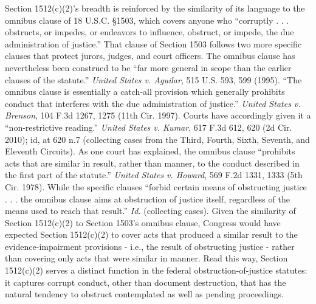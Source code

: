Section 1512(c)(2)’s breadth is reinforced by the similarity of its language to the omnibus clause of 18 U.S.C. \S 1503, which covers anyone who “corruptly . . . obstructs, or impedes, or endeavors to influence, obstruct, or impede, the due administration of justice.” That clause of Section 1503 follows two more specific clauses that protect jurors, judges, and court officers.
The omnibus clause has nevertheless been construed to be “far more general in scope than the earlier clauses of the statute.”
\textit{United States v. Aguilar}, 515 U.S. 593, 599 (1995).
“The omnibus clause is essentially a catch-all provision which generally prohibits conduct that interferes with the due administration of justice.”
\textit{United States v. Brenson}, 104 F.3d 1267, 1275 (11th Cir. 1997).
Courts have accordingly given it a “non-restrictive reading.”
\textit{United States v. Kumar}, 617 F.3d 612, 620 (2d Cir. 2010); id, at 620 n.7 (collecting cases from the Third, Fourth, Sixth, Seventh, and Eleventh Circuits).
As one court has explained, the omnibus clause “prohibits acts that are similar in result, rather than manner, to the conduct described in the first part of the statute.”
\textit{United States v. Howard}, 569 F.2d 1331, 1333 (5th Cir. 1978).
While the specific clauses “forbid certain means of obstructing justice . . . the omnibus clause aims at obstruction of justice itself, regardless of the means used to reach that result.”
\textit{Id.} (collecting cases).
Given the similarity of Section 1512(c)(2) to Section 1503’s omnibus clause, Congress would have expected Section 1512(c)(2) to cover acts that produced a similar result to the evidence-impairment provisions - i.e., the result of obstructing justice - rather than covering only acts that were similar in manner.
Read this way, Section 1512(c)(2) serves a distinct function in the federal obstruction-of-justice statutes: it captures corrupt conduct, other than document destruction, that has the natural tendency to obstruct contemplated as well as pending proceedings.

